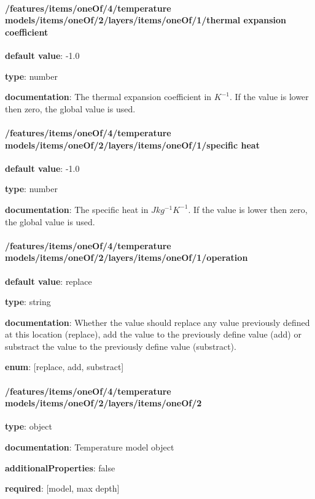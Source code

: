 \begin{itemized}
\end{itemized}\paragraph{/features/items/oneOf/4/temperature models/items/oneOf/2/layers/items/oneOf/1/thermal expansion coefficient} \begin{itemized}
\item {\bf default value}: -1.0
\item {\bf type}: number
\item {\bf documentation}: The thermal expansion coefficient in $K^{-1}$. If the value is lower then zero, the global value is used.
\end{itemized}\paragraph{/features/items/oneOf/4/temperature models/items/oneOf/2/layers/items/oneOf/1/specific heat} \begin{itemized}
\item {\bf default value}: -1.0
\item {\bf type}: number
\item {\bf documentation}: The specific heat in $J kg^{-1} K^{-1}$. If the value is lower then zero, the global value is used.
\end{itemized}\paragraph{/features/items/oneOf/4/temperature models/items/oneOf/2/layers/items/oneOf/1/operation} \begin{itemized}
\item {\bf default value}: replace
\item {\bf type}: string
\item {\bf documentation}: Whether the value should replace any value previously defined at this location (replace), add the value to the previously define value (add) or substract the value to the previously define value (substract).
\item {\bf enum}: [replace, add, substract]\end{itemized}\paragraph{/features/items/oneOf/4/temperature models/items/oneOf/2/layers/items/oneOf/2} \begin{itemized}
\item {\bf type}: object
\item {\bf documentation}: Temperature model object
\item {\bf additionalProperties}: false
\item {\bf required}: [model, max depth]\end{itemized}
